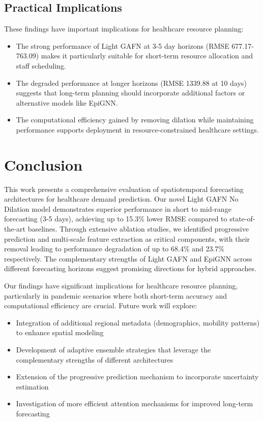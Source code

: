 \documentclass[lettersize, journal]{IEEEtran}
\begin{document}
\subsection{Practical Implications}
These findings have important implications for healthcare resource planning:
\begin{itemize}
    \item The strong performance of Light GAFN at 3-5 day horizons (RMSE 677.17-763.09) makes it particularly suitable for short-term resource allocation and staff scheduling.
    
    \item The degraded performance at longer horizons (RMSE 1339.88 at 10 days) suggests that long-term planning should incorporate additional factors or alternative models like EpiGNN.
    
    \item The computational efficiency gained by removing dilation while maintaining performance supports deployment in resource-constrained healthcare settings.
\end{itemize}

\section{Conclusion}
This work presents a comprehensive evaluation of spatiotemporal forecasting architectures for healthcare demand prediction. Our novel Light GAFN No Dilation model demonstrates superior performance in short to mid-range forecasting (3-5 days), achieving up to 15.3\% lower RMSE compared to state-of-the-art baselines. Through extensive ablation studies, we identified progressive prediction and multi-scale feature extraction as critical components, with their removal leading to performance degradation of up to 68.4\% and 23.7\% respectively. The complementary strengths of Light GAFN and EpiGNN across different forecasting horizons suggest promising directions for hybrid approaches.

Our findings have significant implications for healthcare resource planning, particularly in pandemic scenarios where both short-term accuracy and computational efficiency are crucial. Future work will explore:
\begin{itemize}
    \item Integration of additional regional metadata (demographics, mobility patterns) to enhance spatial modeling
    \item Development of adaptive ensemble strategies that leverage the complementary strengths of different architectures
    \item Extension of the progressive prediction mechanism to incorporate uncertainty estimation
    \item Investigation of more efficient attention mechanisms for improved long-term forecasting
\end{itemize}
\end{document}

